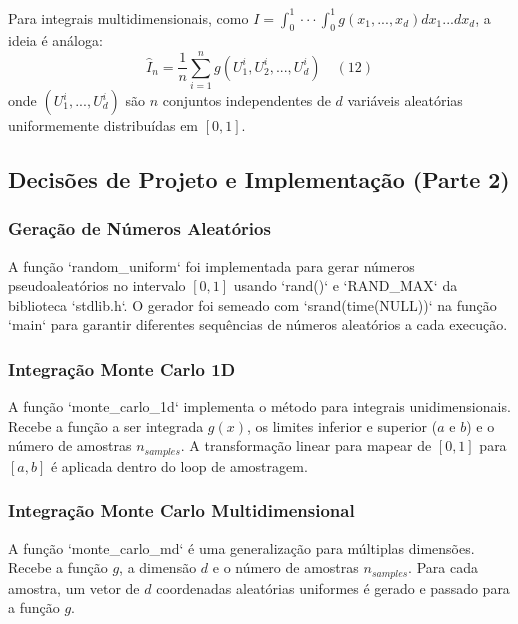 \documentclass{article}
\begin{document}
Para integrais multidimensionais, como $I=\int_{0}^{1}\cdot\cdot\cdot\int_{0}^{1}g(x_1,...,x_d)dx_1...dx_d$, a ideia é análoga:
$$ \hat{I}_n = \frac{1}{n}\sum_{i=1}^{n}g(U_1^i, U_2^i, ..., U_d^i) \quad (12)$$
onde $(U_1^i, ..., U_d^i)$ são $n$ conjuntos independentes de $d$ variáveis aleatórias uniformemente distribuídas em $[0,1]$.

\subsection{Decisões de Projeto e Implementação (Parte 2)}
\subsubsection{Geração de Números Aleatórios}
A função `random\_uniform` foi implementada para gerar números pseudoaleatórios no intervalo $[0,1]$ usando `rand()` e `RAND\_MAX` da biblioteca `stdlib.h`. O gerador foi semeado com `srand(time(NULL))` na função `main` para garantir diferentes sequências de números aleatórios a cada execução.

\subsubsection{Integração Monte Carlo 1D}
A função `monte\_carlo\_1d` implementa o método para integrais unidimensionais. Recebe a função a ser integrada $g(x)$, os limites inferior e superior ($a$ e $b$) e o número de amostras $n_{samples}$. A transformação linear para mapear de $[0,1]$ para $[a,b]$ é aplicada dentro do loop de amostragem.

\subsubsection{Integração Monte Carlo Multidimensional}
A função `monte\_carlo\_md` é uma generalização para múltiplas dimensões. Recebe a função $g$, a dimensão $d$ e o número de amostras $n_{samples}$. Para cada amostra, um vetor de $d$ coordenadas aleatórias uniformes é gerado e passado para a função $g$.
\end{document}
